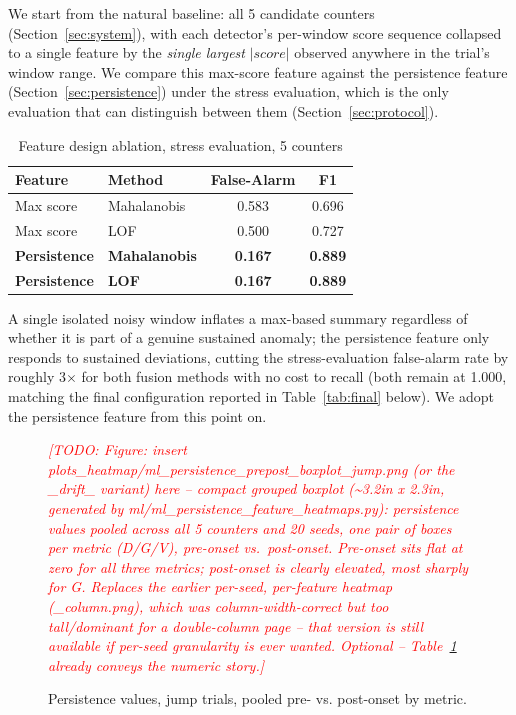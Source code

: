 \documentclass[conference]{IEEEtran}
\newcommand{\todo}[1]{\textcolor{red}{\itshape [TODO: #1]}}
\begin{document}
We start from the natural baseline: all 5 candidate counters (Section~\ref{sec:system}), with each detector's per-window score sequence collapsed to a single feature by the \emph{single largest} $|score|$ observed anywhere in the trial's window range. We compare this max-score feature against the persistence feature (Section~\ref{sec:persistence}) under the stress evaluation, which is the only evaluation that can distinguish between them (Section~\ref{sec:protocol}).

\begin{table}[htbp]
\centering
\caption{Feature design ablation, stress evaluation, 5 counters}
\label{tab:persistence}
\begin{tabular}{@{}llcc@{}}
\toprule
Feature & Method & False-Alarm & F1 \\
\midrule
Max score        & Mahalanobis & 0.583 & 0.696 \\
Max score        & LOF         & 0.500 & 0.727 \\
\textbf{Persistence} & \textbf{Mahalanobis} & \textbf{0.167} & \textbf{0.889} \\
\textbf{Persistence} & \textbf{LOF}         & \textbf{0.167} & \textbf{0.889} \\
\bottomrule
\end{tabular}
\end{table}

A single isolated noisy window inflates a max-based summary regardless of whether it is part of a genuine sustained anomaly; the persistence feature only responds to sustained deviations, cutting the stress-evaluation false-alarm rate by roughly 3$\times$ for both fusion methods with no cost to recall (both remain at 1.000, matching the final configuration reported in Table~\ref{tab:final} below). We adopt the persistence feature from this point on.

\begin{figure}[htbp]
\centering
\todo{Figure: insert plots\_heatmap/ml\_persistence\_prepost\_boxplot\_jump.png (or the \_drift\_ variant) here -- compact grouped boxplot (\textasciitilde3.2in x 2.3in, generated by ml/ml\_persistence\_feature\_heatmaps.py): persistence values pooled across all 5 counters and 20 seeds, one pair of boxes per metric (D/G/V), pre-onset vs.\ post-onset. Pre-onset sits flat at zero for all three metrics; post-onset is clearly elevated, most sharply for G. Replaces the earlier per-seed, per-feature heatmap (\_column.png), which was column-width-correct but too tall/dominant for a double-column page -- that version is still available if per-seed granularity is ever wanted. Optional -- Table~\ref{tab:persistence} already conveys the numeric story.}
\caption{Persistence values, jump trials, pooled pre- vs. post-onset by metric.}
\label{fig:heatmap}
\end{figure}
\end{document}
